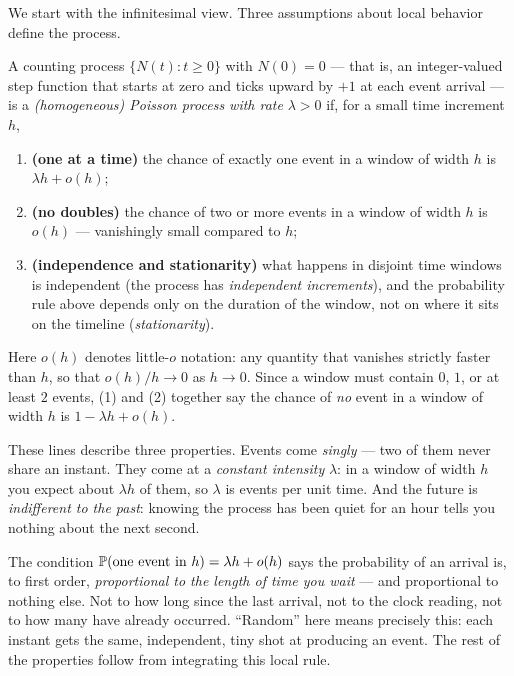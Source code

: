 We start with the infinitesimal view. Three assumptions about local behavior define the process.

\begin{definition}
\label{ch25:def-infinitesimal}
A counting process $\{N(t): t \ge 0\}$ with $N(0)=0$ --- that is, an integer-valued
step function that starts at zero and ticks upward by $+1$ at each event arrival --- is
a \emph{(homogeneous) Poisson process with rate} $\lambda > 0$ if, for a small time
increment $h$,
\begin{enumerate}
\item \textbf{(one at a time)} the chance of exactly one event in a window of
width $h$ is $\lambda h + o(h)$;
\item \textbf{(no doubles)} the chance of two or more events in a window of width
$h$ is $o(h)$ --- vanishingly small compared to $h$;
\item \textbf{(independence and stationarity)} what happens in disjoint time windows is
independent (the process has \emph{independent increments}), and the probability rule
above depends only on the duration of the window, not on where it sits on the timeline
(\emph{stationarity}).
\end{enumerate}
Here $o(h)$ denotes little-$o$ notation: any quantity that vanishes strictly faster
than $h$, so that $o(h)/h \to 0$ as $h \to 0$. Since a window must contain $0$, $1$, or
at least $2$ events, (1) and (2) together say the chance of \emph{no} event in a window of
width $h$ is $1 - \lambda h + o(h)$.
\end{definition}

These lines describe three properties. Events come \emph{singly} --- two of them
never share an instant. They come at a \emph{constant intensity} $\lambda$: in a
window of width $h$ you expect about $\lambda h$ of them, so $\lambda$ is events
per unit time. And the future is \emph{indifferent to the past}: knowing the
process has been quiet for an hour tells you nothing about the next second.

\begin{happeningbox}
The condition $\P(\text{one event in }h) = \lambda h + o(h)$ says the probability of an arrival is, to first order, \emph{proportional to the length of time you wait} --- and proportional to nothing else. Not to how long since the last arrival, not to the clock reading,
not to how many have already occurred. ``Random'' here means precisely this:
each instant gets the same, independent, tiny shot at producing an event. The rest of the properties follow from integrating this local rule.
\end{happeningbox}


